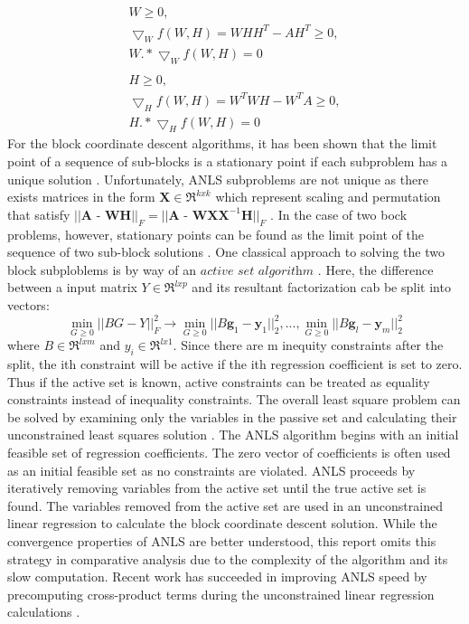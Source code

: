 \documentclass[final,leqno,onefignum,onetabnum]{siamltex1213}
\begin{document}
\begin{equation}\label{EKx}
 \begin{align}
  W \ge 0,\\
  \bigtriangledown_W f(W,H)  = WHH^T - AH^T \ge 0,\\
  W.* \bigtriangledown_Wf(W,H) = 0\\ \\
    H \ge 0,\\ 
  \bigtriangledown_H f(W,H)  = W^T WH - W^T A \ge 0,\\
  H.* \bigtriangledown_Hf(W,H) = 0  
  \end{align}
\end{equation}
For the block coordinate descent algorithms, it has been shown that the limit point of a sequence of sub-blocks is a stationary point if each subproblem has a unique solution \cite{Ber2}. Unfortunately, ANLS subproblems are not unique as there exists matrices in the form $ \textbf{X} \in \Re^{kxk} $ which represent scaling and permutation that satisfy $ || \textbf{A - WH} ||_{F} = || \textbf{A - WXX}^{-1} \textbf{H} ||_{F} $ \cite{Kim1}.  In the case of two bock problems, however, stationary points can be found as the limit point of the sequence of two sub-block solutions \cite{Gri}. One classical approach to solving the two block subploblems is by way of an $\textit{active set algorithm}$ \cite{Law}. Here, the difference between a input matrix $ Y \in \Re^{lxp}$  and its resultant factorization cab be split into vectors:
\begin{equation}
    \min_{G \ge 0} || BG-Y ||^{2}_{F} \to  \min_{G \ge 0} || B\textbf{g}_1-\textbf{y}_1 ||^{2}_{2}, ...,   \min_{G \ge 0} || B\textbf{g}_l-\textbf{y}_m ||^{2}_{2}
\end{equation}
where $ B \in \Re^{lxm}$ and $y_i \in \Re^{lx1}$. Since there are m inequity constraints after the split, the ith constraint will be active if the ith regression coefficient is set to zero. Thus if the active set is known, active constraints can be treated as equality constraints instead of inequality constraints. The overall least square problem can be solved by examining only the variables in the passive set and calculating their unconstrained least squares solution \cite{Bro}. The ANLS algorithm begins with an initial feasible set of regression coefficients. The zero vector of coefficients is often used as an initial feasible set as no constraints are violated. ANLS proceeds by iteratively removing variables from the active set until the true active set is found. The variables removed from the active set are used in an unconstrained linear regression to calculate the block coordinate descent solution. While the convergence properties of ANLS are better understood, this report omits this strategy in comparative analysis due to the complexity of the algorithm and its slow computation. Recent work has succeeded in improving ANLS speed by precomputing cross-product terms during the unconstrained linear regression calculations \cite{Bro}. 
\end{document}
